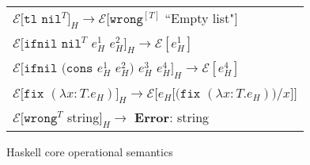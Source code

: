 \begin{figure}[ph!]
\begin{tabular}{l}
\vspace{5pt}

$\mathscr{E}[\mathtt{tl}$ $\mathtt{nil}^{T}]_{H}\rightarrow\mathscr{E}[\mathtt{wrong}^{[T]}$ ``Empty list"$]$ \\

\vspace{5pt}

$\mathscr{E}[\mathtt{ifnil}$ $\mathtt{nil}^{T}$ $e_{H}^{1}$ $e_{H}^{2}]_{H}\rightarrow\mathscr{E}[e_{H}^{1}]$ \\

\vspace{5pt}

$\mathscr{E}[\mathtt{ifnil}$ $(\mathtt{cons}$ $e_{H}^{1}$ $e_{H}^{2})$ $e_{H}^{3}$ $e_{H}^{4}]_{H}\rightarrow\mathscr{E}[e_{H}^{4}]$ \\

\vspace{5pt}

$\mathscr{E}[\mathtt{fix}$ $(\lambda x:T.e_{H})]_{H}\rightarrow\mathscr{E}[e_{H}[(\mathtt{fix}$ $(\lambda x:T.e_{H}))/x]]$ \\

\vspace{5pt}

$\mathscr{E}[\mathtt{wrong}^{T}$ string$]_{H}\rightarrow$ \textbf{Error}: string
\end{tabular}
\caption{Haskell core operational semantics}
\label{hcos}
\end{figure}